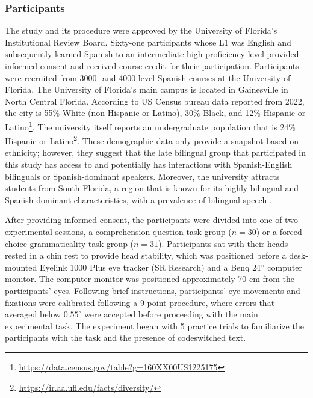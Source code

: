 \documentclass[output=paper,colorlinks,citecolor=brown]{langscibook}
\begin{document}
\subsubsection{Participants}
The study and its procedure were approved by the University of Florida’s Institutional Review Board. Sixty-one participants whose L1 was English and subsequently learned Spanish to an intermediate-high proficiency level provided informed consent and received course credit for their participation. Participants were recruited from 3000- and 4000-level Spanish courses at the University of Florida. The University of Florida’s main campus is located in Gainesville in North Central Florida. According to US Census bureau data reported from 2022, the city is 55\% White (non-Hispanic or Latino), 30\% Black, and 12\% Hispanic or Latino\footnote{\url{https://data.census.gov/table?g=160XX00US1225175}}. The university itself reports an undergraduate population that is 24\% Hispanic or Latino\footnote{\url{https://ir.aa.ufl.edu/facts/diversity/}}. These demographic data only provide a snapshot based on ethnicity; however, they suggest that the late bilingual group that participated in this study has access to and potentially has interactions with Spanish-English bilinguals or Spanish-dominant speakers. Moreover, the university attracts students from South Florida, a region that is known for its highly bilingual and Spanish-dominant characteristics, with a prevalence of bilingual speech \citep{CarterLynch2015,Deucharetal2014}.

After providing informed consent, the participants were divided into one of two experimental sessions, a comprehension question task group ($n = 30$) or a forced-choice grammaticality task group ($n = 31$). Participants sat with their heads rested in a chin rest to provide head stability, which was positioned before a desk-mounted Eyelink 1000 Plus eye tracker (SR Research) and a Benq 24'' computer monitor. The computer monitor was positioned approximately 70 cm from the participants’ eyes. Following brief instructions, participants’ eye movements and fixations were calibrated following a 9-point procedure, where errors that averaged below $0.55^{\circ}$ were accepted before proceeding with the main experimental task. The experiment began with 5 practice trials to familiarize the participants with the task and the presence of codeswitched text.
\end{document}
